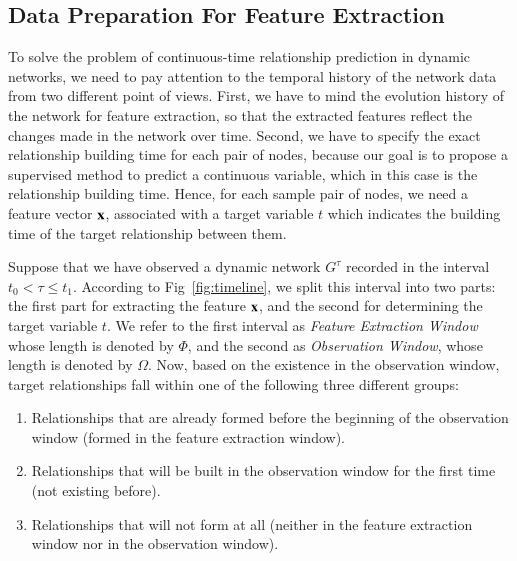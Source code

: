 \subsection{Data Preparation For Feature Extraction}
To solve the problem of continuous-time relationship prediction in dynamic networks, we need to pay attention to the temporal history of the network data from two different point of views. First, we have to mind the evolution history of the network for feature extraction, so that the extracted features reflect the changes made in the network over time. Second, we have to specify the exact relationship building time for each pair of nodes, because our goal is to propose a supervised method to predict a continuous variable, which in this case is the relationship building time. Hence, for each sample pair of nodes, we need a feature vector $\mathbf{x}$, associated with a target variable $t$ which indicates the building time of the target relationship between them.

Suppose that we have observed a dynamic network $G^{\tau}$ recorded in the interval $t_0 <\tau\le t_1$. According to Fig~\ref{fig:timeline}, we split this interval into two parts: the first part for extracting the feature $\mathbf{x}$, and the second for determining the target variable $t$. We refer to the first interval as \emph{Feature Extraction Window} whose length is denoted by $\Phi$, and the second as \emph{Observation Window}, whose length is denoted by $\Omega$. Now, based on the existence in the observation window, target relationships fall within one of the following three different groups:

\begin{enumerate}
	\item Relationships that are already formed before the beginning of the observation window (formed in the feature extraction window).
	\item Relationships that will be built in the observation window for the first time (not existing before).
	\item Relationships that will not form at all (neither in the feature extraction window nor in the observation window).
\end{enumerate}

